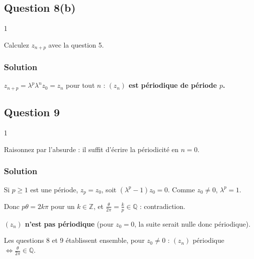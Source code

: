 \documentclass[11pt,a4paper]{article}
\begin{document}
\hypertarget{question-8b}{%
\subsection{Question 8(b)}\label{question-8b}}

\begin{indication}{1}

Calculez \(z_{n+p}\) avec la question 5.

\end{indication}

\hypertarget{solution-51}{%
\subsubsection{Solution}\label{solution-51}}

\(z_{n+p}=\lambda^p\lambda^nz_0=z_n\) pour tout \(n\) : \textbf{\((z_n)\) est périodique de période \(p\).}

\hypertarget{question-9}{%
\subsection{Question 9}\label{question-9}}

\begin{indication}{1}

Raisonnez par l'absurde : il suffit d'écrire la périodicité en \(n=0\).

\end{indication}

\hypertarget{solution-52}{%
\subsubsection{Solution}\label{solution-52}}

Si \(p\ge1\) est une période, \(z_p=z_0\), soit \((\lambda^p-1)z_0=0\). Comme \(z_0\neq0\), \(\lambda^p=1\).

Donc \(p\theta=2k\pi\) pour un \(k\in\mathbb{Z}\), et \(\frac\theta{2\pi}=\frac kp\in\mathbb{Q}\) : contradiction.

\textbf{\((z_n)\) n'est pas périodique} (pour \(z_0=0\), la suite serait nulle donc périodique).

\begin{methode}

Les questions 8 et 9 établissent ensemble, pour \(z_0\neq0\) : \((z_n)\) périodique \(\iff\frac\theta{2\pi}\in\mathbb{Q}\).

\end{methode}
\end{document}
